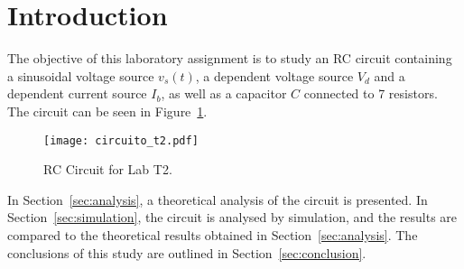 \pagebreak
\section{Introduction}
\label{sec:introduction}

The objective of this laboratory assignment is to study an RC circuit containing a sinusoidal voltage source $v_s(t)$, a dependent voltage source $V_d$ and a dependent current source $I_b$, as well as a capacitor $C$ connected to 7 resistors. The circuit can be seen in Figure~\ref{fig:circuito_t2}.

\begin{figure}[h] \centering
\texttt{[image: circuito\_t2.pdf]}
\caption{RC Circuit for Lab T2.}
\label{fig:circuito_t2}
\end{figure}

In Section~\ref{sec:analysis}, a theoretical analysis of the circuit is
presented. In Section~\ref{sec:simulation}, the circuit is analysed by
simulation, and the results are compared to the theoretical results obtained in
Section~\ref{sec:analysis}. The conclusions of this study are outlined in
Section~\ref{sec:conclusion}.


